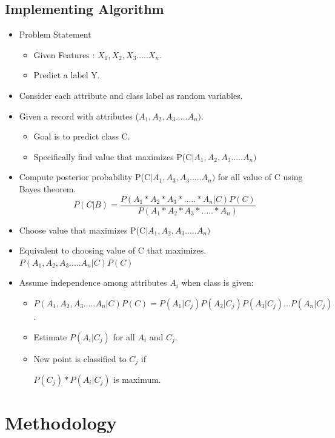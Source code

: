 \section{Implementing Algorithm}
\begin{itemize}
\item Problem Statement

\begin{itemize}
 \item Given Features : $X_1,X_2,X_3.....X_n.$
 \item Predict a label Y.
\end{itemize}

\item Consider each attribute and class label as random variables.
\item Given a record with attributes ($A_1,A_2,A_3.....A_n)$.
\begin{itemize}
\item Goal is to predict class C.
\item Specifically find value that maximizes P(C$|A_1,A_2,A_3.....A_n)$
\end{itemize}
\item Compute posterior probability P(C$|A_1,A_3,A_3.....A_n)$ for all value of C using Bayes theorem.
\[P(C|B)=\frac{P(A_1*A_2*A_3*.....*A_n|C)P(C)}{P(A_1*A_2*A_3*.....*A_n)}\]
\item Choose value that maximizes P(C$|A_1,A_2,A_3.....A_n)$
\item Equivalent to choosing value of C that maximizes.
$P(A_1,A_2,A_3.....A_n|C)P(C)$

\item Assume independence among attributes $A_i$ when class is given:
\begin{itemize}
\item $P(A_1,A_2,A_3.....A_n|C)P(C)=P(A_1|C_j)P(A_2|C_j)P(A_3|C_j)...P(A_n|C_j)$.
\item Estimate $P(A_i|C_j)$ for all $A_i$ and $C_j$.
\item New point is classified to $C_j$ if
\par 
$P(C_j)*P(A_i|C_j)$ is maximum.
\end{itemize}


\end{itemize}

\chapter{Methodology}

